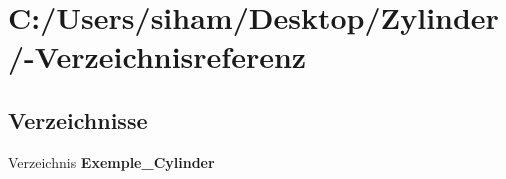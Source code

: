 \section{C:/Users/siham/Desktop/Zylinder/-Verzeichnisreferenz}
\label{dir_C_3A_2FUsers_2Fsiham_2FDesktop_2FZylinder_2F}


\subsection*{Verzeichnisse}
\begin{CompactItemize}
\item 
Verzeichnis {\bf Exemple\_\-Cylinder}
\end{CompactItemize}

